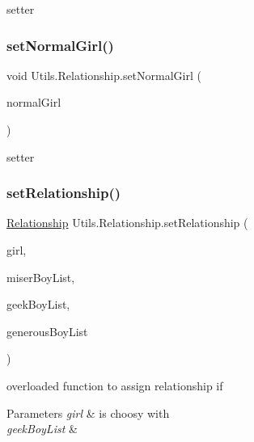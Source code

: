 setter \mbox{\label{class_utils_1_1_relationship_acbb106ec4a7792afb3e2cfc480ccc057}} 
\subsubsection{\texorpdfstring{set\+Normal\+Girl()}{setNormalGirl()}}
{\footnotesize\ttfamily void Utils.\+Relationship.\+set\+Normal\+Girl (\begin{DoxyParamCaption}\item[{\hyperlink{class_girls_1_1_normal_girl}{Normal\+Girl}}]{normal\+Girl }\end{DoxyParamCaption})\hspace{0.3cm}{\ttfamily [inline]}}

setter \mbox{\label{class_utils_1_1_relationship_aef210c6f2f468e1988319b940e9648cd}} 
\subsubsection{\texorpdfstring{set\+Relationship()}{setRelationship()}\hspace{0.1cm}{\footnotesize\ttfamily [1/3]}}
{\footnotesize\ttfamily \hyperlink{class_utils_1_1_relationship}{Relationship} Utils.\+Relationship.\+set\+Relationship (\begin{DoxyParamCaption}\item[{\hyperlink{class_girls_1_1_choosy_girl}{Choosy\+Girl}}]{girl,  }\item[{Array\+List$<$ \hyperlink{class_boys_1_1_miser_boy}{Miser\+Boy} $>$}]{miser\+Boy\+List,  }\item[{Array\+List$<$ \hyperlink{class_boys_1_1_geek_boy}{Geek\+Boy} $>$}]{geek\+Boy\+List,  }\item[{Array\+List$<$ \hyperlink{class_boys_1_1_generous_boy}{Generous\+Boy} $>$}]{generous\+Boy\+List }\end{DoxyParamCaption})\hspace{0.3cm}{\ttfamily [inline]}}

overloaded function to assign relationship if 
\begin{DoxyParams}{Parameters}
{\em girl} & is choosy with \\
\hline
{\em geek\+Boy\+List} & \\
\hline
\end{DoxyParams}
\mbox{\label{class_utils_1_1_relationship_aafa58e57e84056a3666041f8f85238f1}} 
